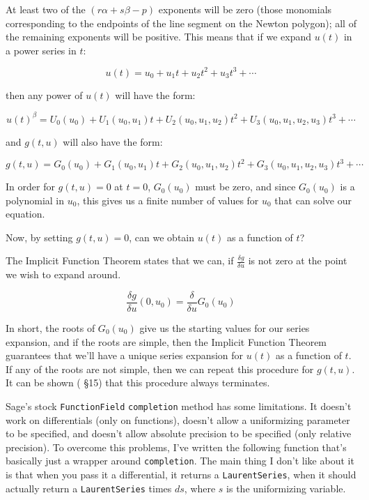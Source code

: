At least two of the $(r \alpha + s \beta - p)$ exponents will be zero
(those monomials corresponding to the endpoints of the line segment on
the Newton polygon); all of the remaining exponents will be positive.
This means that if we expand $u(t)$ in a power series in $t$:

$$u(t) = u_0 + u_1 t + u_2 t^2 + u_3 t^3 + \cdots$$

then any power of $u(t)$ will have the form:

$$u(t)^\beta = U_0(u_0) + U_1(u_0, u_1) t + U_2(u_0, u_1, u_2) t^2 + U_3(u_0,u_1,u_2,u_3) t^3 + \cdots$$

and $g(t,u)$ will also have the form:

$$g(t,u) = G_0(u_0) + G_1(u_0, u_1) t + G_2(u_0, u_1, u_2) t^2 + G_3(u_0,u_1,u_2,u_3) t^3 + \cdots$$

In order for $g(t,u)=0$ at $t=0$, $G_0(u_0)$ must be zero, and since $G_0(u_0)$ is a polynomial
in $u_0$, this gives us a finite number of values for $u_0$ that can solve our equation.

Now, by setting $g(t,u)=0$, can we obtain $u(t)$ as a function of $t$?

The Implicit Function Theorem states that we can, if $\frac{\delta g}{\delta u}$ is not zero
at the point we wish to expand around.

$$\frac{\delta g}{\delta u}(0,u_0) = \frac{\delta}{\delta u} G_0(u_0)$$

In short, the roots of $G_0(u_0)$ give us the starting values for our series expansion,
and if the roots are simple, then the Implicit Function Theorem guarantees that we'll
have a unique series expansion for $u(t)$ as a function of $t$.  If any of the roots
are not simple, then we can repeat this procedure for $g(t,u)$.  It can be shown
(\cite{bliss} \S 15) that this procedure always terminates.

\vfill\eject

Sage's stock {\tt FunctionField} {\tt completion} method has some limitations.  It doesn't work on
differentials (only on functions), doesn't allow a uniformizing parameter to be
specified, and doesn't allow absolute precision to be specified (only relative precision).
To overcome this problems, I've written the following function that's basically just
a wrapper around {\tt completion}.  The main thing I don't like about it is that
when you pass it a differential, it returns a {\tt LaurentSeries}, when it should actually
return a {\tt LaurentSeries} times $ds$, where $s$ is the uniformizing variable.

